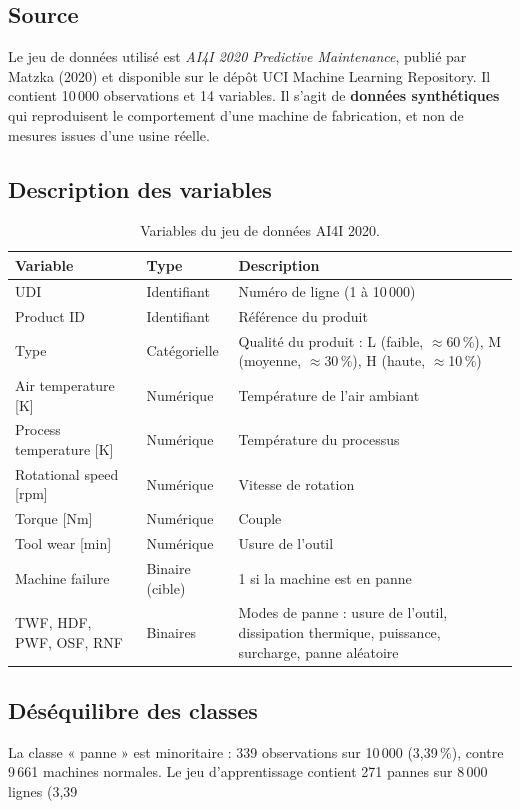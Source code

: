 \documentclass[12pt,a4paper]{article}
\begin{document}
\subsection{Source}
Le jeu de données utilisé est \emph{AI4I 2020 Predictive Maintenance}, publié par Matzka (2020) et disponible sur le dépôt UCI Machine Learning Repository. Il contient 10\,000 observations et 14 variables. Il s'agit de \textbf{données synthétiques} qui reproduisent le comportement d'une machine de fabrication, et non de mesures issues d'une usine réelle.

\subsection{Description des variables}

\begin{table}[H]
\centering
\small
\begin{tabularx}{\textwidth}{@{}l l X@{}}
\toprule
\textbf{Variable} & \textbf{Type} & \textbf{Description} \\
\midrule
UDI & Identifiant & Numéro de ligne (1 à 10\,000) \\
Product ID & Identifiant & Référence du produit \\
Type & Catégorielle & Qualité du produit : L (faible, $\approx$60\,\%), M (moyenne, $\approx$30\,\%), H (haute, $\approx$10\,\%) \\
Air temperature [K] & Numérique & Température de l'air ambiant \\
Process temperature [K] & Numérique & Température du processus \\
Rotational speed [rpm] & Numérique & Vitesse de rotation \\
Torque [Nm] & Numérique & Couple \\
Tool wear [min] & Numérique & Usure de l'outil \\
Machine failure & Binaire (cible) & 1 si la machine est en panne \\
TWF, HDF, PWF, OSF, RNF & Binaires & Modes de panne : usure de l'outil, dissipation thermique, puissance, surcharge, panne aléatoire \\
\bottomrule
\end{tabularx}
\caption{Variables du jeu de données AI4I 2020.}
\end{table}

\subsection{Déséquilibre des classes}
La classe « panne » est minoritaire : 339 observations sur 10\,000 (3,39\,\%), contre 9\,661 machines normales. Le jeu d'apprentissage contient 271 pannes sur 8\,000 lignes (3,39\,%
\end{document}
